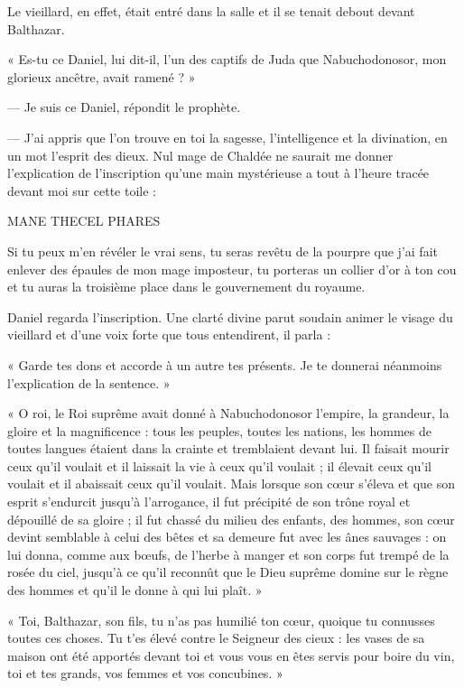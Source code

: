 \documentclass[a4paper, 11pt, oneside, polutonikogreek, french]{article}
\begin{document}
\bigskip
\centerline{\EightStarTaper}
\centerline{\EightStarTaper\EightStarTaper}
\bigskip

Le vieillard, en effet, était entré dans la salle et il se tenait debout devant Balthazar.

« Es-tu ce Daniel, lui dit-il, l'un des captifs de Juda que Nabuchodonosor, mon glorieux ancêtre, avait ramené ? »

--- Je suis ce Daniel, répondit le prophète.

--- J'ai appris que l'on trouve en toi la sagesse, l'intelligence et la divination, en un mot l'esprit des dieux. Nul mage de Chaldée ne saurait me donner l'explication de l'inscription qu'une main mystérieuse a tout à l'heure tracée devant moi sur cette toile :

MANE THECEL PHARES

Si tu peux m'en révéler le vrai sens, tu seras revêtu de la pourpre que j'ai fait enlever des épaules de mon mage imposteur, tu porteras un collier d'or à ton cou et tu auras la troisième place dans le gouvernement du royaume.

Daniel regarda l'inscription. Une clarté divine parut soudain animer le visage du vieillard et d'une voix forte que tous entendirent, il parla :

« Garde tes dons et accorde à un autre tes présents. Je te donnerai néanmoins l'explication de la sentence. »

« O roi, le Roi suprême avait donné à Nabuchodonosor l'empire, la grandeur, la gloire et la magnificence : tous les peuples, toutes les nations, les hommes de toutes langues étaient dans la crainte et tremblaient devant lui. Il faisait mourir ceux qu'il voulait et il laissait la vie à ceux qu'il voulait ; il élevait ceux qu'il voulait et il abaissait ceux qu'il voulait. Mais lorsque son cœur s'éleva et que son esprit s'endurcit jusqu'à l'arrogance, il fut précipité de son trône royal et dépouillé de sa gloire ; il fut chassé du milieu des enfants, des hommes, son cœur devint semblable à celui des bêtes et sa demeure fut avec les ânes sauvages : on lui donna, comme aux bœufs, de l'herbe à manger et son corps fut trempé de la rosée du ciel, jusqu'à ce qu'il reconnût que le Dieu suprême domine sur le règne des hommes et qu'il le donne à qui lui plaît. »

« Toi, Balthazar, son fils, tu n'as pas humilié ton cœur, quoique tu connusses toutes ces choses. Tu t'es élevé contre le Seigneur des cieux : les vases de sa maison ont été apportés devant toi et vous vous en êtes servis pour boire du vin, toi et tes grands, vos femmes et vos concubines. »
\end{document}
